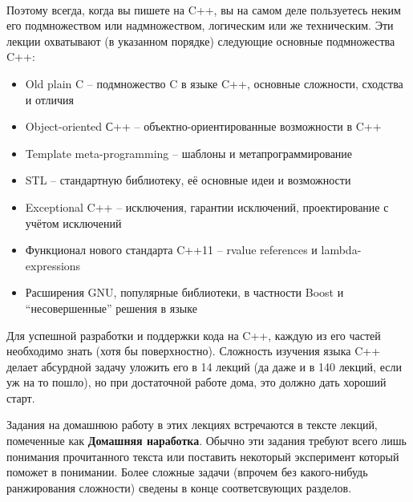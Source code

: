 \documentclass[a4paper,12pt,oneside]{article}
\begin{document}
\paragraph{}
Поэтому всегда, когда вы пишете на C++, вы на самом деле пользуетесь неким его подмножеством или надмножеством, логическим или же техническим. Эти лекции охватывают (в указанном порядке) следующие основные подмножества C++:
\begin{itemize}
\item
Old plain C – подмножество C в языке C++, основные сложности, сходства и отличия
\item
Object-oriented С++ – объектно-ориентированные возможности в C++
\item
Template meta-programming – шаблоны и метапрограммирование
\item
STL – стандартную библиотеку, её основные идеи и возможности
\item
Exceptional C++ – исключения, гарантии исключений, проектирование с учётом исключений
\item
Функционал нового стандарта C++11 – rvalue references и  lambda-expressions
\item
Расширения GNU, популярные библиотеки, в частности Boost и ``несовершенные'' решения в языке
\end{itemize}

Для успешной разработки и поддержки кода на C++, каждую из его частей необходимо знать (хотя бы поверхностно). Сложность изучения языка C++ делает абсурдной задачу уложить его в 14 лекций (да даже и в 140 лекций, если уж на то пошло), но при достаточной работе дома, это должно дать хороший старт.

Задания на домашнюю работу в этих лекциях встречаются в тексте лекций, помеченные как \textbf{Домашняя наработка}. Обычно эти задания требуют всего лишь понимания прочитанного текста или поставить некоторый эксперимент который поможет в понимании. Более сложные задачи (впрочем без какого-нибудь ранжирования сложности) сведены в конце соответсвующих разделов.

\pagebreak
\end{document}
